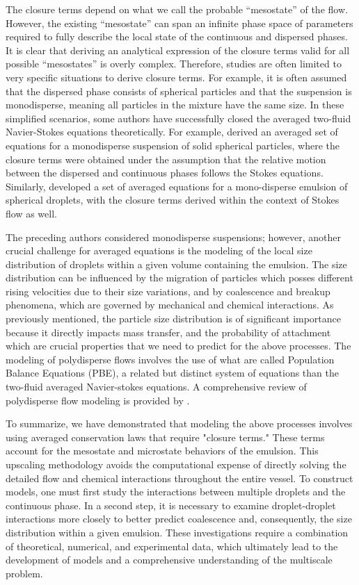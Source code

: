 The closure terms depend on what we call the probable ``mesostate'' of the flow. 
However, the existing ``mesostate'' can span an infinite phase space of parameters required to fully describe the local state of the continuous and dispersed phases.
It is clear that deriving an analytical expression of the closure terms valid for all possible ``mesostates'' is overly complex.
Therefore, studies are often limited to very specific situations to derive closure terms.
For example, it is often assumed that the dispersed phase consists of spherical particles and that the suspension is monodisperse, meaning all particles in the mixture have the same size.
In these simplified scenarios, some authors have successfully closed the averaged two-fluid Navier-Stokes equations theoretically.
For example, \citet{jackson1997locally} derived an averaged set of equations for a monodisperse suspension of solid spherical particles, where the closure terms were obtained under the assumption that the relative motion between the dispersed and continuous phases follows the Stokes equations. 
Similarly, \citet{zhang1997momentum} developed a set of averaged equations for a mono-disperse emulsion of spherical droplets, with the closure terms derived within the context of Stokes flow as well.


The preceding authors considered monodisperse suspensions; however, another crucial challenge for averaged equations is the modeling of the local size distribution of droplets within a given volume containing the emulsion.
The size distribution can be influenced by the migration of particles which posses different rising velocities due to their size variations, and by coalescence and breakup phenomena, which are governed by mechanical and chemical interactions.
As previously mentioned, the particle size distribution is of significant importance because it directly impacts mass transfer, and the probability of attachment which are crucial properties that we need to predict for the above processes.
The modeling of polydisperse flows involves the use of what are called Population Balance Equations (PBE), a related but distinct system of equations than the two-fluid averaged Navier-stokes equations.
A comprehensive review of polydisperse flow modeling is provided by  \citet{marchisio2013computational}. 


To summarize, we have demonstrated that modeling the above processes involves using averaged conservation laws that require "closure terms." These terms account for the mesostate and microstate behaviors of the emulsion. 
This upscaling methodology avoids the computational expense of directly solving the detailed flow and chemical interactions throughout the entire vessel.
To construct models, one must first study the interactions between multiple droplets and the continuous phase. 
In a second step, it is necessary to examine droplet-droplet interactions more closely to better predict coalescence and, consequently, the size distribution within a given emulsion.
These investigations require a combination of theoretical, numerical, and experimental data, which ultimately lead to the development of models and a comprehensive understanding of the multiscale problem. 

